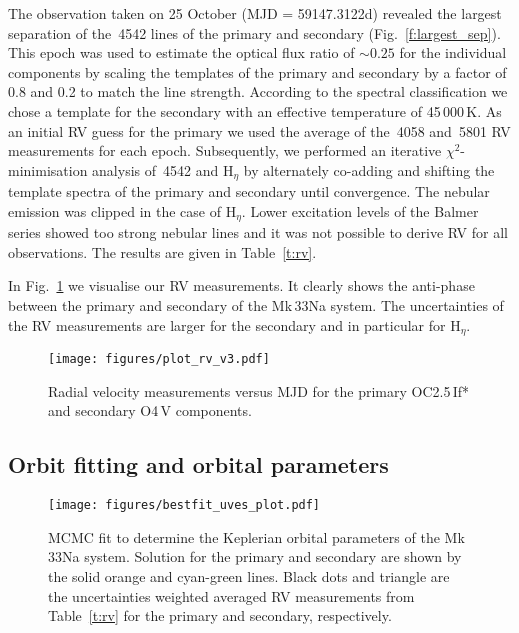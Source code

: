 \documentclass[fleqn,usenatbib]{mnras}
\begin{document}
The observation taken on 25 October (MJD = 59147.3122d) revealed the largest separation of the \,4542 lines of the primary and secondary (Fig.~\ref{f:largest_sep}). This epoch was used to estimate the optical flux ratio of $\sim 0.25$ for the individual components by scaling the templates of the primary and secondary by a factor of 0.8 and 0.2 to match the  line strength. According to the spectral classification we chose a template for the secondary with an effective temperature of 45\,000\,K. As an initial RV guess for the primary we used the average of the \,4058 and \,5801 RV measurements for each epoch. Subsequently, we performed an iterative $\chi^2$-minimisation analysis of \,4542 and $\mathrm{H}_\eta$ by alternately co-adding and shifting the template spectra of the primary and secondary until convergence. The nebular emission was clipped in the case of $\mathrm{H}_\eta$. Lower excitation levels of the Balmer series showed too strong nebular lines and it was not possible to derive RV for all observations. The results are given in Table~\ref{t:rv}.

In Fig.~\ref{f:rv_measurements} we visualise our RV measurements. It clearly shows the anti-phase between the primary and secondary of the Mk\,33Na system. The uncertainties of the RV measurements are larger for the secondary and in particular for $\mathrm{H}_\eta$.

\begin{figure}
	\texttt{[image: figures/plot\_rv\_v3.pdf]}
    \caption{Radial velocity measurements versus MJD for the primary OC2.5\,If* and secondary O4\,V components.}
    \label{f:rv_measurements}
\end{figure}

\subsection{Orbit fitting and orbital parameters}\label{s:orbit_par}

\begin{figure*}
	\texttt{[image: figures/bestfit\_uves\_plot.pdf]}
    \caption{MCMC fit to determine the Keplerian orbital parameters of the Mk\,33Na system. Solution for the primary and secondary are shown by the solid orange and cyan-green lines. Black dots and triangle are the uncertainties weighted averaged RV measurements from Table~\ref{t:rv} for the primary and secondary, respectively.}
    \label{f:orbit_param}
\end{figure*}
\end{document}
